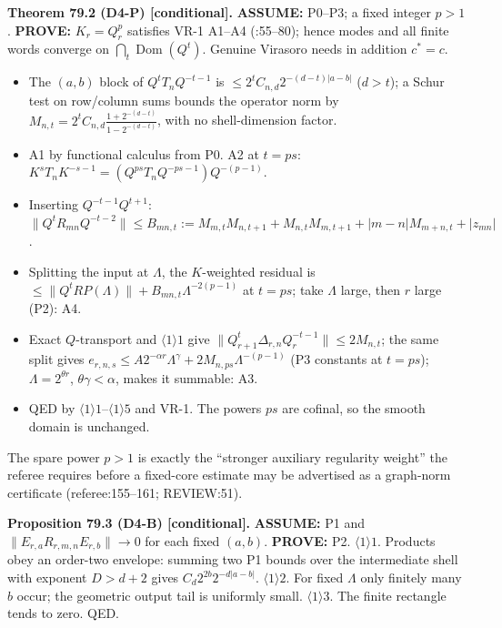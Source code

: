 \textbf{Theorem 79.2 (D4-P) [conditional].}
\textbf{ASSUME:} P0--P3; a fixed integer \(p>1\).  \textbf{PROVE:} \(K_r=Q_r^p\) satisfies
VR-1 A1--A4 (:55--80); hence modes and all finite words converge
on \(\bigcap_t\operatorname{Dom}(Q^t)\).  Genuine Virasoro needs in addition \(c^*=c\).
\begin{itemize}
\item[\(\langle1\rangle1\).] The \((a,b)\) block of \(Q^tT_nQ^{-t-1}\) is
\(\le2^tC_{n,d}2^{-(d-t)|a-b|}\) (\(d>t\)); a Schur test on row/column sums bounds the
operator norm by \(M_{n,t}=2^tC_{n,d}\frac{1+2^{-(d-t)}}{1-2^{-(d-t)}}\), with no shell-dimension factor.
\item[\(\langle1\rangle2\).] A1 by functional calculus from P0.  A2 at \(t=ps\):
\(K^sT_nK^{-s-1}=(Q^{ps}T_nQ^{-ps-1})Q^{-(p-1)}\).
\item[\(\langle1\rangle3\).] Inserting \(Q^{-t-1}Q^{t+1}\):
\(\|Q^tR_{mn}Q^{-t-2}\|\le B_{mn,t}:=M_{m,t}M_{n,t+1}+M_{n,t}M_{m,t+1}+|m-n|M_{m+n,t}+|z_{mn}|\).
\item[\(\langle1\rangle4\).] Splitting the input at \(\Lambda\), the \(K\)-weighted residual is
\(\le\|Q^tRP(\Lambda)\|+B_{mn,t}\Lambda^{-2(p-1)}\) at \(t=ps\); take \(\Lambda\) large, then \(r\) large (P2): A4.
\item[\(\langle1\rangle5\).] Exact \(Q\)-transport and \(\langle1\rangle1\) give
\(\|Q_{r+1}^t\Delta_{r,n}Q_r^{-t-1}\|\le2M_{n,t}\); the same split gives
\(e_{r,n,s}\le A2^{-\alpha r}\Lambda^{\gamma}+2M_{n,ps}\Lambda^{-(p-1)}\) (P3 constants at \(t=ps\)); \(\Lambda=2^{\theta r}\),
\(\theta\gamma<\alpha\), makes it summable: A3.
\item[\(\langle1\rangle6\).] QED by \(\langle1\rangle1\)--\(\langle1\rangle5\) and VR-1.  The powers \(ps\) are cofinal, so the smooth domain is unchanged.
\end{itemize}
The spare power \(p>1\) is exactly the ``stronger auxiliary regularity weight'' the referee
requires before a fixed-core estimate may be advertised as a graph-norm certificate
(referee:155--161; REVIEW:51).

\textbf{Proposition 79.3 (D4-B) [conditional].}  \textbf{ASSUME:} P1 and
\(\|E_{r,a}R_{r,m,n}E_{r,b}\|\to0\) for each fixed \((a,b)\).  \textbf{PROVE:} P2.
\(\langle1\rangle1\). Products obey an order-two envelope: summing two P1 bounds over the
intermediate shell with exponent \(D>d+2\) gives \(C_d2^{2b}2^{-d|a-b|}\).
\(\langle1\rangle2\). For fixed \(\Lambda\) only finitely many \(b\) occur; the geometric output
tail is uniformly small.  \(\langle1\rangle3\). The finite rectangle tends to zero.  QED.

